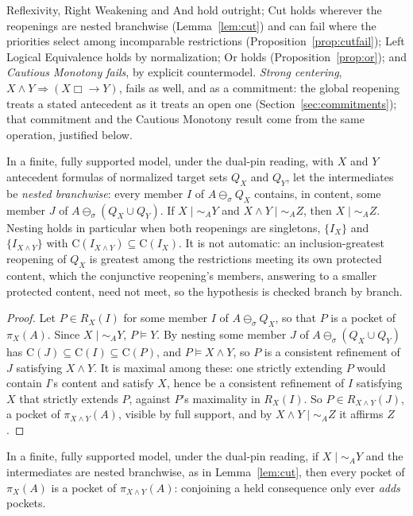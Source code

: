 Reflexivity, Right Weakening and And hold outright; Cut holds wherever the reopenings are nested branchwise (Lemma~\ref{lem:cut}) and can fail where the priorities select among incomparable restrictions (Proposition~\ref{prop:cutfail}); Left Logical Equivalence holds by normalization; Or holds (Proposition~\ref{prop:or}); and \emph{Cautious Monotony fails}, by explicit countermodel. \emph{Strong centering}, $X \wedge Y \Rightarrow (X \mathrel{\Box\!\!\rightarrow} Y)$, fails as well, and as a commitment: the global reopening treats a stated antecedent as it treats an open one (Section~\ref{sec:commitments}); that commitment and the Cautious Monotony result come from the same operation, justified below.
\begin{lemma}[Cut]\label{lem:cut} In a finite, fully supported model, under the dual-pin reading, with $X$ and $Y$ antecedent formulas of normalized target sets $Q_X$ and $Q_Y$, let the intermediates be \emph{nested branchwise}: every member $I$ of $A \ominus_{\sigma} Q_X$ contains, in content, some member $J$ of $A \ominus_{\sigma} (Q_X \cup Q_Y)$. If $X \mid\sim_A Y$ and $X \wedge Y \mid\sim_A Z$, then $X \mid\sim_A Z$. Nesting holds in particular when both reopenings are singletons, $\{I_X\}$ and $\{I_{X \wedge Y}\}$ with $\mathrm{C}(I_{X \wedge Y}) \subseteq \mathrm{C}(I_X)$. It is not automatic: an inclusion-greatest reopening of $Q_X$ is greatest among the restrictions meeting its own protected content, which the conjunctive reopening's members, answering to a smaller protected content, need not meet, so the hypothesis is checked branch by branch. \end{lemma}
\begin{proof}
Let $P \in R_X(I)$ for some member $I$ of $A \ominus_{\sigma} Q_X$, so that $P$ is a pocket of $\pi_X(A)$. Since $X \mid\sim_A Y$, $P \models Y$. By nesting some member $J$ of $A \ominus_{\sigma} (Q_X \cup Q_Y)$ has $\mathrm{C}(J) \subseteq \mathrm{C}(I) \subseteq \mathrm{C}(P)$, and $P \models X \wedge Y$, so $P$ is a consistent refinement of $J$ satisfying $X \wedge Y$. It is maximal among these: one strictly extending $P$ would contain $I$'s content and satisfy $X$, hence be a consistent refinement of $I$ satisfying $X$ that strictly extends $P$, against $P$'s maximality in $R_X(I)$. So $P \in R_{X \wedge Y}(J)$, a pocket of $\pi_{X \wedge Y}(A)$, visible by full support, and by $X \wedge Y \mid\sim_A Z$ it affirms $Z$.
\end{proof}
\begin{corollary}\label{cor:pocketmono} In a finite, fully supported model, under the dual-pin reading, if $X \mid\sim_A Y$ and the intermediates are nested branchwise, as in Lemma~\ref{lem:cut}, then every pocket of $\pi_X(A)$ is a pocket of $\pi_{X \wedge Y}(A)$: conjoining a held consequence only ever \emph{adds} pockets.
\end{corollary}
